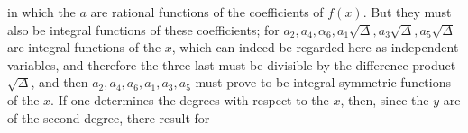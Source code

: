 
in which the $a$ are rational functions of the coefficients of $f(x)$.
But they must also be integral functions of these coefficients;
for $a_2, a_4, \alpha_6, a_1\sqrt{\varDelta}, a_3\sqrt{\varDelta}, a_5\sqrt{\varDelta}$ are integral functions of the %
$x$, which can indeed be regarded here as independent variables, and
therefore the three last must be divisible by the difference product $\sqrt{\varDelta}$,
and then $a_2, a_4, a_6, a_1, a_3, a_5$ must prove to be integral
symmetric functions of the $x$. If one determines the
degrees with respect to the $x$, then, since the $y$ are of the second
degree, there result for
